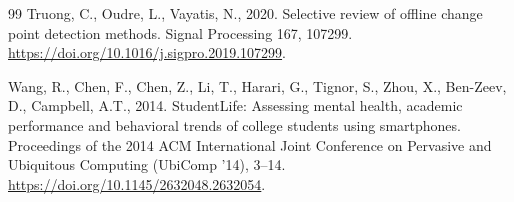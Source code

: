\documentclass[preprint,12pt,authoryear]{elsarticle}
\begin{document}
\begin{thebibliography}{99}
Truong, C., Oudre, L., Vayatis, N., 2020.
Selective review of offline change point detection methods.
Signal Processing 167, 107299.
\url{https://doi.org/10.1016/j.sigpro.2019.107299}.

Wang, R., Chen, F., Chen, Z., Li, T., Harari, G., Tignor, S., Zhou,
X., Ben-Zeev, D., Campbell, A.T., 2014.
StudentLife: Assessing mental health, academic performance and behavioral
trends of college students using smartphones.
Proceedings of the 2014 ACM International Joint Conference on Pervasive
and Ubiquitous Computing (UbiComp '14), 3--14.
\url{https://doi.org/10.1145/2632048.2632054}.

\end{thebibliography}
\end{document}
